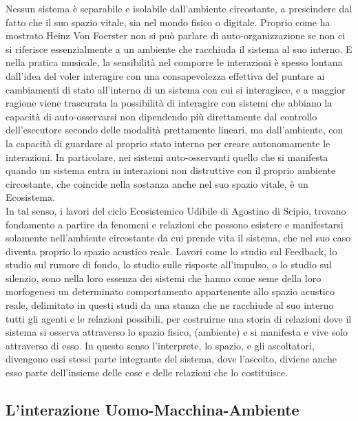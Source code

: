 Nessun sistema è separabile e isolabile dall'ambiente circostante, 
a prescindere dal fatto che il suo spazio vitale, sia nel mondo fisico o digitale. 
Proprio come ha mostrato Heinz Von Foerster non si può parlare di auto-organizzazione
se non ci si riferisce essenzialmente a un ambiente che racchiuda il sistema al suo interno.
E nella pratica musicale, la sensibilità nel comporre le interazioni
è spesso lontana dall'idea del voler interagire con una consapevolezza effettiva del 
puntare ai cambiamenti di stato all'interno di un sistema con cui si interagisce,
e a maggior ragione viene trascurata la possibilità di interagire con sistemi che abbiano
la capacità di auto-osservarsi non dipendendo più direttamente dal controllo dell'esecutore 
secondo delle modalità prettamente lineari, 
ma dall'ambiente, 
con la capacità di guardare al proprio stato interno per creare autonomamente le interazioni.
In particolare, nei sistemi auto-osservanti quello che si manifesta quando un sistema entra in interazioni non distruttive
con il proprio ambiente circostante, che coincide nella sostanza anche nel suo spazio vitale, è un Ecosistema. \\
In tal senso, i lavori del ciclo Ecosistemico Udibile di Agostino di Scipio, 
trovano fondamento a partire da fenomeni e relazioni che possono esistere e manifestarsi solamente nell'ambiente 
circostante da cui prende vita il sistema, 
che nel suo caso diventa proprio lo spazio acustico reale. 
Lavori come lo studio sul Feedback, lo studio sul rumore di fondo, lo studio sulle risposte all'impulso, o
lo studio sul silenzio, sono nella loro essenza dei sistemi che hanno come seme 
della loro morfogenesi un determinato 
comportamento appartenente allo spazio acustico reale, delimitato in questi studi da una stanza
che ne racchiude al suo interno tutti gli agenti e le relazioni possibili,
per costruirne una storia di relazioni dove il sistema si osserva attraverso lo spazio fisico, 
(ambiente) e si manifesta e vive solo attraverso di esso.
In questo senso l’interprete, lo spazio, e gli ascoltatori, 
divengono essi stessi parte integrante del sistema, dove l’ascolto, diviene anche esso
parte dell’insieme delle cose e delle relazioni che lo costituisce. \\

\subsection{L'interazione Uomo-Macchina-Ambiente}
\label{sec:L'interazione Uomo-Macchina-Ambiente}

